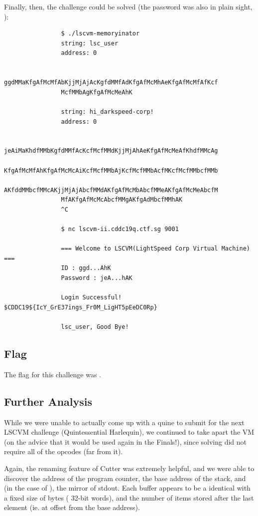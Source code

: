 		\pagebreak
		Finally, then, the challenge could be solved (the password was also in plain sight, ):

		\begin{listing}[!htbp]
			\begin{verbatim}
				$ ./lscvm-memoryinator
				string: lsc_user
				address: 0

				ggdMMaKfgAfMcMfAbKjjMjAjAcKgfdMMfAdKfgAfMcMhAeKfgAfMcMfAfKcf
				McfMMbAgKfgAfMcMeAhK

				string: hi_darkspeed-corp!
				address: 0

				jeAiMaKhdfMMbKgfdMMfAcKcfMcfMMdKjjMjAhAeKfgAfMcMeAfKhdfMMcAg
				KfgAfMcMfAhKfgAfMcMcAiKcfMcfMMbAjKcfMcfMMbAcfMKcfMcfMMbcfMMb
				AKfddMMbcfMMcAKjjMjAjAbcfMMdAKfgAfMcMbAbcfMMeAKfgAfMcMeAbcfM
				MfAKfgAfMcMcAbcfMMgAKfgAdMbcfMMhAK
				^C

				$ nc lscvm-ii.cddc19q.ctf.sg 9001

				=== Welcome to LSCVM(LightSpeed Corp Virtual Machine) ===
				ID : ggd...AhK
				Password : jeA...hAK

				Login Successful! $CDDC19${IcY_GrE37ings_Fr0M_LigHT5pEeDC0Rp}

				lsc_user, Good Bye!
			\end{verbatim}
		\end{listing}



	\subsection{Flag}
		The flag for this challenge was .


	\subsection{Further Analysis}
		While we were unable to actually come up with a quine to submit for the next LSCVM challenge (Quintessential Harlequin), we
		continued to take apart the VM (on the advice that it would be used again in the Finals!), since solving  did
		not require all of the opcodes (far from it).

		Again, the renaming feature of Cutter was extremely helpful, and we were able to discover the address of the program counter, the
		base address of the stack, and (in the case of ), the mirror of stdout. Each buffer appears to be a identical
		with a fixed size of  bytes ( 32-bit words), and the number of items stored after the last
		element (ie. at offset  from the base address).

